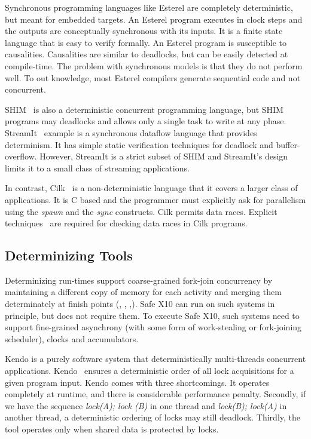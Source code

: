 Synchronous programming languages like Esterel are completely
deterministic, but meant for embedded targets. An Esterel program
executes in clock steps and the outputs are conceptually synchronous
with its inputs.  It is a finite state language that is easy to verify
formally. An Esterel program is susceptible to
causalities. Causalities are similar to deadlocks, but can be easily
detected at compile-time.  The problem with synchronous models is that
they do not perform well. To out knowledge, most Esterel compilers
generate sequential code and not concurrent.

SHIM~\cite{edwards2005shim2,tardieu2006scheduling-independent} is also
a deterministic concurrent programming language, but SHIM programs may
deadlocks and allows only a single task to write at any
phase. StreamIt~\cite{thies2001streamit} example is a synchronous
dataflow language that provides determinism. It has simple static
verification techniques for deadlock and buffer-overflow.  However,
StreamIt is a strict subset of SHIM and StreamIt's design limits it to
a small class of streaming applications.

In contrast,
Cilk~\cite{blumofe1995cilk} is a non-deterministic language that it covers a larger
class of applications. It is C based
and the programmer must explicitly ask for parallelism using
the \emph{spawn} and the \emph{sync} constructs.
Cilk permits data races.
Explicit techniques~\cite{cheng1998detecting} are
required for checking data races in Cilk programs.



\subsection{Determinizing Tools}
Determinizing run-times support coarse-grained fork-join concurrency
by maintaining a different copy of memory for each activity and
merging them determinately at finish points (\cite{grace},
\cite{dmp}, \cite{kendo},\cite{determinator}). Safe
X10 can run on such systems in principle, but does not require them.
To execute Safe X10, such systems need to support fine-grained
asynchrony (with some form of work-stealing or fork-joining
scheduler), clocks and accumulators.

Kendo is a purely software system that deterministically multi-threads
concurrent applications.  Kendo~\cite{olszewski2009kendo} ensures a
deterministic order of all lock acquisitions for a given program
input. Kendo comes with three shortcomings. It operates completely at runtime,
and there is considerable performance penalty. Secondly, if
we have the sequence \emph{lock(A); lock (B)} in one thread and
\emph{lock(B); lock(A)} in another thread, a deterministic ordering of
locks may still deadlock. Thirdly, the tool operates only when
shared data is protected by locks.

